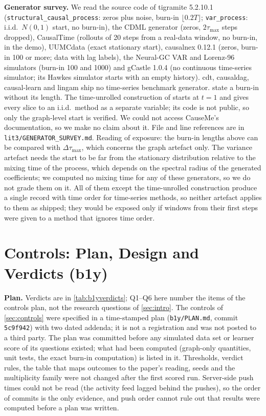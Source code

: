 \textbf{Generator survey.} We read the source code of tigramite 5.2.10.1
(\texttt{structural\_causal\_process}: zeros plus noise, burn-in
$\lfloor0.2T\rfloor$; \texttt{var\_process}: i.i.d.\ $N(0,1)$ start, no burn-in),
the CDML generator \citep{lawrence2021dgp} (zeros, $2\tau_{\max}$ steps dropped),
CausalTime \citep{cheng2024causaltime} (rollouts of 20 steps from a real-data
window, no burn-in, in the demo), UUMCdata \citep{herman2025unitless} (exact
stationary start), causalnex 0.12.1 (zeros, burn-in 100 or more; data with lag
labels), the Neural-GC VAR and Lorenz-96 simulators \citep{tank2021neural}
(burn-in 100 and 1000) and gCastle 1.0.4 (no continuous time-series
simulator; its Hawkes simulator starts with an empty history). cdt, causaldag,
causal-learn and lingam ship no time-series benchmark generator.
\citet{lohse2025sortability} state a burn-in without its length. The
time-unrolled construction of \citet{reisach2026topological} starts at $t=1$
and gives every slice to an i.i.d.\ method as a separate variable; its code is
not public, so only the graph-level start is verified. We could not access CauseMe's
documentation, so we make no claim about it. File
and line references are in \texttt{lit3/GENERATOR\_SURVEY.md}. Reading of
exposure: the burn-in lengths above can be compared with
$\Delta\tau_{\max}$, which concerns the graph artefact only. The variance
artefact needs the start to be far from the stationary distribution relative
to the mixing time of the process, which depends on the spectral radius of
the generated coefficients; we computed no mixing time for any of these
generators, so we do not grade them on it. All of them except the
time-unrolled construction produce a single record with time order for
time-series methods, so neither artefact applies to them as shipped; they
would be exposed only if windows from their first steps were given to a
method that ignores time order.

\section{Controls: Plan, Design and Verdicts (b1y)}
\label{app:b1y}

\textbf{Plan.} Verdicts are in \cref{tab:b1yverdicts}; Q1--Q6 here number the
items of the controls plan, not the research questions of \cref{sec:intro}.
The controls of \cref{sec:controls} were specified in a
time-stamped plan (\texttt{b1y/PLAN.md}, commit \texttt{5c9f942}) with two
dated addenda; it is not a registration and was not posted to a third party.
The plan was committed before any simulated data set or learner score of its
questions existed; what had been computed (graph-only quantities, unit tests,
the exact burn-in computation) is listed in it. Thresholds, verdict rules, the
table that maps outcomes to the paper's reading, seeds and the multiplicity
family were not changed after the first scored run. Server-side push times could
not be read (the activity feed lagged behind the pushes), so the order of commits
is the only evidence, and push order cannot rule out that results were computed
before a plan was written.


